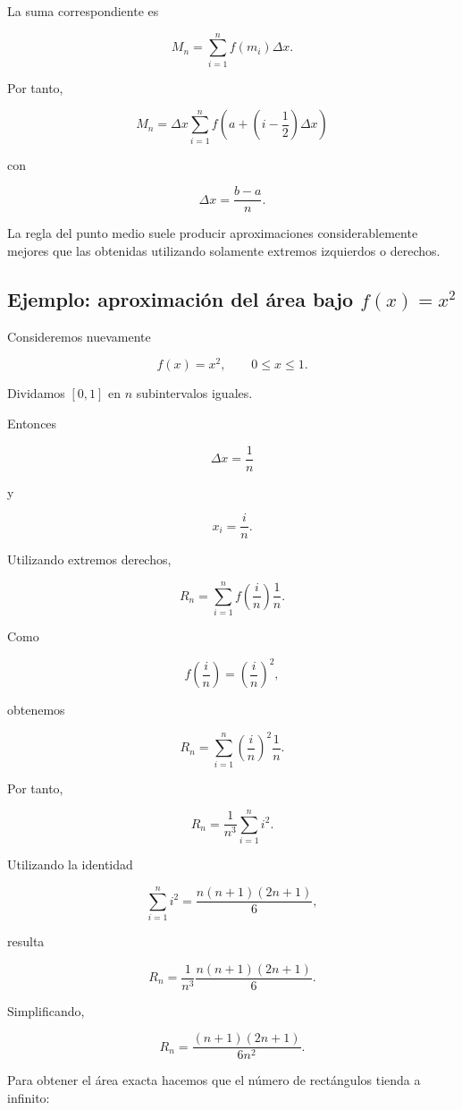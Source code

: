 \documentclass[12pt]{article}
\begin{document}
La suma correspondiente es

\[
M_n
=
\sum_{i=1}^{n}
f(m_i)\Delta x.
\]

Por tanto,

\[
\boxed{
M_n
=
\Delta x
\sum_{i=1}^{n}
f\left(
a+\left(i-\frac{1}{2}\right)\Delta x
\right)
}
\]

con

\[
\Delta x=\frac{b-a}{n}.
\]

La regla del punto medio suele producir aproximaciones considerablemente
mejores que las obtenidas utilizando solamente extremos izquierdos o
derechos.

\subsection{Ejemplo: aproximación del área bajo $f(x)=x^2$}

Consideremos nuevamente

\[
f(x)=x^2,
\qquad
0\leq x\leq1.
\]

Dividamos $[0,1]$ en $n$ subintervalos iguales.

Entonces

\[
\Delta x=\frac{1}{n}
\]

y

\[
x_i=\frac{i}{n}.
\]

Utilizando extremos derechos,

\[
R_n
=
\sum_{i=1}^{n}
f\left(\frac{i}{n}\right)\frac{1}{n}.
\]

Como

\[
f\left(\frac{i}{n}\right)
=
\left(\frac{i}{n}\right)^2,
\]

obtenemos

\[
R_n
=
\sum_{i=1}^{n}
\left(\frac{i}{n}\right)^2
\frac{1}{n}.
\]

Por tanto,

\[
R_n
=
\frac{1}{n^3}
\sum_{i=1}^{n}i^2.
\]

Utilizando la identidad

\[
\sum_{i=1}^{n}i^2
=
\frac{n(n+1)(2n+1)}{6},
\]

resulta

\[
R_n
=
\frac{1}{n^3}
\frac{n(n+1)(2n+1)}{6}.
\]

Simplificando,

\[
R_n
=
\frac{(n+1)(2n+1)}{6n^2}.
\]

Para obtener el área exacta hacemos que el número de rectángulos tienda
a infinito:
\end{document}

